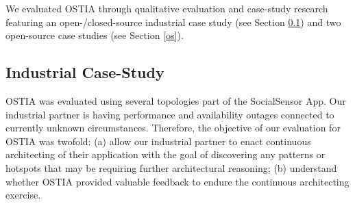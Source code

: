 
We evaluated OSTIA through qualitative evaluation and case-study research featuring an open-/closed-source industrial case study (see Section \ref{cs}) and two open-source case studies (see Section \ref{os}).


\subsection{Industrial Case-Study}\label{cs}

OSTIA was evaluated using several topologies part of the SocialSensor App. Our industrial partner is having
performance and availability outages connected to currently unknown
circumstances. Therefore, the objective of our evaluation for OSTIA was twofold:
(a) allow our industrial partner to enact continuous architecting of their
application with the goal of discovering any patterns or hotspots that may be
requiring further architectural reasoning; (b) understand whether OSTIA provided
valuable feedback to endure the continuous architecting exercise.

